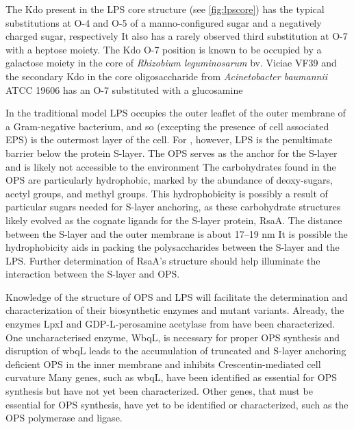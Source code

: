 The Kdo present in the \ac{LPS} core structure (see \cref{fig:lpscore}) has the typical
substitutions at O-4 and O-5 of a manno-configured sugar and a negatively charged sugar,
respectively It also has a rarely observed third substitution at O-7 with a
heptose moiety. The Kdo O-7 position is known to be occupied by a galactose moiety in the core of
\textit{Rhizobium leguminosarum} bv. Viciae VF39 and the secondary Kdo in
the core oligosaccharide from \textit{Acinetobacter baumannii} ATCC 19606 has an O-7 substituted
with a glucosamine

In the traditional model \ac{LPS} occupies the outer leaflet of the outer membrane of a
Gram-negative bacterium, and so (excepting the presence of cell associated \ac{EPS}) is the
outermost layer of the cell. For \caulobacter, however, \ac{LPS} is the penultimate barrier below
the protein \ac{S-layer}. The \caulobacter{} \ac{OPS} serves as the anchor for the S-layer and is
likely not accessible to the environment The carbohydrates found in the \ac{OPS}
are particularly hydrophobic, marked by the abundance of deoxy-sugars, acetyl groups, and methyl
groups. This hydrophobicity is possibly a result of particular sugars needed for \ac{S-layer}
anchoring, as these carbohydrate structures likely evolved as the cognate ligands for the
\ac{S-layer} protein, RsaA. The distance between the \ac{S-layer} and the outer membrane is about
17--19 nm It is possible the hydrophobicity aids in packing the polysaccharides
between the S-layer and the \ac{LPS}. Further determination of RsaA's structure should help
illuminate the interaction between the S-layer and \ac{OPS}.

Knowledge of the structure of \caulobacter{} \ac{OPS} and \ac{LPS} will facilitate the determination
and characterization of their biosynthetic enzymes and mutant variants. Already, the enzymes
LpxI and GDP-L-perosamine acetylase from
\caulobacter have been characterized. One uncharacterised enzyme, WbqL, is necessary for proper
\ac{OPS} synthesis and disruption of wbqL leads to the accumulation of truncated and S-layer
anchoring deficient \ac{OPS} in the inner membrane and inhibits Crescentin-mediated cell
curvature Many genes, such as wbqL, have been identified as
essential for \ac{OPS} synthesis but have not yet been characterized. Other
genes, that must be essential for \ac{OPS} synthesis, have yet to be identified or characterized,
such as the \ac{OPS} polymerase and ligase.

